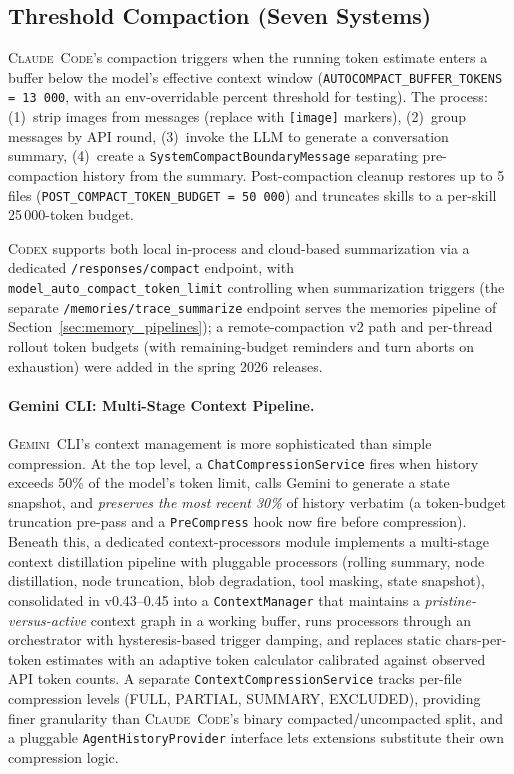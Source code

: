 \documentclass[11pt,a4paper]{article}
\newcommand{\clcode}{\textsc{Claude~Code}\xspace}
\newcommand{\cdx}{\textsc{Codex}\xspace}
\newcommand{\gemini}{\textsc{Gemini~CLI}\xspace}
\begin{document}
\subsection{Threshold Compaction (Seven Systems)}

\clcode{}'s compaction triggers when the running token estimate enters a buffer below the model's effective context window (\texttt{AUTOCOMPACT\_BUFFER\_TOKENS = 13\,000}, with an env-overridable percent threshold for testing).
The process: (1)~strip images from messages (replace with \texttt{[image]} markers), (2)~group messages by API round, (3)~invoke the LLM to generate a conversation summary, (4)~create a \texttt{SystemCompactBoundaryMessage} separating pre-compaction history from the summary.
Post-compaction cleanup restores up to 5 files (\texttt{POST\_COMPACT\_TOKEN\_BUDGET = 50\,000}) and truncates skills to a per-skill 25\,000-token budget.

\cdx{} supports both local in-process and cloud-based summarization via a dedicated \texttt{/responses/compact} endpoint, with \texttt{model\_auto\_compact\_token\_limit} controlling when summarization triggers (the separate \texttt{/memories/\allowbreak trace\_summarize} endpoint serves the memories pipeline of Section~\ref{sec:memory_pipelines}); a remote-compaction v2 path and per-thread rollout token budgets (with remaining-budget reminders and turn aborts on exhaustion) were added in the spring 2026 releases.

\paragraph{Gemini CLI: Multi-Stage Context Pipeline.}
\gemini{}'s context management is more sophisticated than simple compression.
At the top level, a \texttt{ChatCompressionService} fires when history exceeds 50\% of the model's token limit, calls Gemini to generate a state snapshot, and \emph{preserves the most recent 30\%} of history verbatim (a token-budget truncation pre-pass and a \texttt{PreCompress} hook now fire before compression).
Beneath this, a dedicated context-processors module implements a multi-stage context distillation pipeline with pluggable processors (rolling summary, node distillation, node truncation, blob degradation, tool masking, state snapshot), consolidated in v0.43--0.45 into a \texttt{ContextManager} that maintains a \emph{pristine-versus-active} context graph in a working buffer, runs processors through an orchestrator with hysteresis-based trigger damping, and replaces static chars-per-token estimates with an adaptive token calculator calibrated against observed API token counts.
A separate \texttt{ContextCompressionService} tracks per-file compression levels (FULL, PARTIAL, SUMMARY, EXCLUDED), providing finer granularity than \clcode{}'s binary compacted/uncompacted split, and a pluggable \texttt{AgentHistoryProvider} interface lets extensions substitute their own compression logic.
\end{document}
